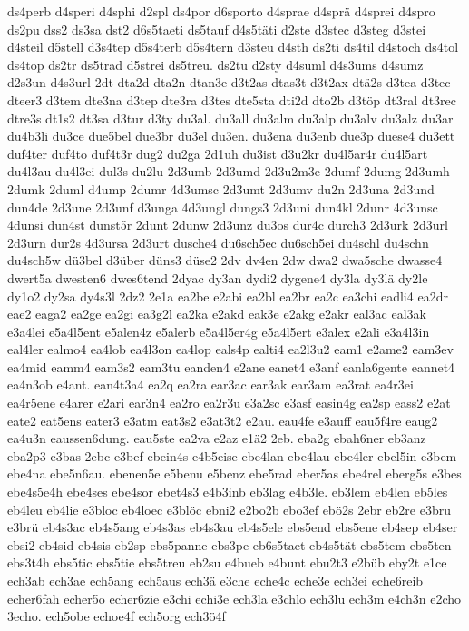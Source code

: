 {ds4perb
d4speri
d4sphi
d2spl
ds4por
d6sporto
d4sprae
d4sprä
d4sprei
d4spro
ds2pu
dss2
ds3sa
dst2
d6s5taeti
ds5tauf
d4s5täti
d2ste
d3stec
d3steg
d3stei
d4steil
d5stell
d3s4tep
d5s4terb
d5s4tern
d3steu
d4sth
ds2ti
ds4til
d4stoch
ds4tol
ds4top
ds2tr
ds5trad
d5strei
ds5treu.
ds2tu
d2sty
d4suml
d4s3ums
d4sumz
d2s3un
d4s3url
2dt
dta2d
dta2n
dtan3e
d3t2as
dtas3t
d3t2ax
dtä2s
d3tea
d3tec
dteer3
d3tem
dte3na
d3tep
dte3ra
d3tes
dte5sta
dti2d
dto2b
d3töp
dt3ral
dt3rec
dtre3s
dt1s2
dt3sa
d3tur
d3ty
du3al.
du3all
du3alm
du3alp
du3alv
du3alz
du3ar
du4b3li
du3ce
due5bel
due3br
du3el
du3en.
du3ena
du3enb
due3p
duese4
du3ett
duf4ter
duf4to
duf4t3r
dug2
du2ga
2d1uh
du3ist
d3u2kr
du4l5ar4r
du4l5art
du4l3au
du4l3ei
dul3s
du2lu
2d3umb
2d3umd
2d3u2m3e
2dumf
2dumg
2d3umh
2dumk
2duml
d4ump
2dumr
4d3umsc
2d3umt
2d3umv
du2n
2d3una
2d3und
dun4de
2d3une
2d3unf
d3unga
4d3ungl
dungs3
2d3uni
dun4kl
2dunr
4d3unsc
4dunsi
dun4st
dunst5r
2dunt
2dunw
2d3unz
du3os
dur4c
durch3
2d3urk
2d3url
2d3urn
dur2s
4d3ursa
2d3urt
dusche4
du6sch5ec
du6sch5ei
du4schl
du4schn
du4sch5w
dü3bel
d3über
düns3
düse2
2dv
dv4en
2dw
dwa2
dwa5sche
dwasse4
dwert5a
dwesten6
dwes6tend
2dyac
dy3an
dydi2
dygene4
dy3la
dy3lä
dy2le
dy1o2
dy2sa
dy4s3l
2dz2
2e1a
ea2be
e2abi
ea2bl
ea2br
ea2c
ea3chi
eadli4
ea2dr
eae2
eaga2
ea2ge
ea2gi
ea3g2l
ea2ka
e2akd
eak3e
e2akg
e2akr
eal3ac
eal3ak
e3a4lei
e5a4l5ent
e5alen4z
e5alerb
e5a4l5er4g
e5a4l5ert
e3alex
e2ali
e3a4l3in
eal4ler
ealmo4
ea4lob
ea4l3on
ea4lop
eals4p
ealti4
ea2l3u2
eam1
e2ame2
eam3ev
ea4mid
eamm4
eam3s2
eam3tu
eanden4
e2ane
eanet4
e3anf
eanla6gente
eannet4
ea4n3ob
e4ant.
ean4t3a4
ea2q
ea2ra
ear3ac
ear3ak
ear3am
ea3rat
ea4r3ei
ea4r5ene
e4arer
e2ari
ear3n4
ea2ro
ea2r3u
e3a2sc
e3asf
easin4g
ea2sp
eass2
e2at
eate2
eat5ens
eater3
e3atm
eat3s2
e3at3t2
e2au.
eau4fe
e3auff
eau5f4re
eaug2
ea4u3n
eaussen6dung.
eau5ste
ea2va
e2az
e1ä2
2eb.
eba2g
ebah6ner
eb3anz
eba2p3
e3bas
2ebc
e3bef
ebein4s
e4b5eise
ebe4lan
ebe4lau
ebe4ler
ebel5in
e3bem
ebe4na
ebe5n6au.
ebenen5e
e5benu
e5benz
ebe5rad
eber5as
ebe4rel
eberg5s
e3bes
ebe4s5e4h
ebe4ses
ebe4sor
ebet4s3
e4b3inb
eb3lag
e4b3le.
eb3lem
eb4len
eb5les
eb4leu
eb4lie
e3bloc
eb4loec
e3blöc
ebni2
e2bo2b
ebo3ef
ebö2s
2ebr
eb2re
e3bru
e3brü
eb4s3ac
eb4s5ang
eb4s3as
eb4s3au
eb4s5ele
ebs5end
ebs5ene
eb4sep
eb4ser
ebsi2
eb4sid
eb4sis
eb2sp
ebs5panne
ebs3pe
eb6s5taet
eb4s5tät
ebs5tem
ebs5ten
ebs3t4h
ebs5tic
ebs5tie
ebs5treu
eb2su
e4bueb
e4bunt
ebu2t3
e2büb
eby2t
e1ce
ech3ab
ech3ae
ech5ang
ech5aus
ech3ä
e3che
eche4c
eche3e
ech3ei
eche6reib
echer6fah
echer5o
echer6zie
e3chi
echi3e
ech3la
e3chlo
ech3lu
ech3m
e4ch3n
e2cho
3echo.
ech5obe
echoe4f
ech5org
ech3ö4f
}
